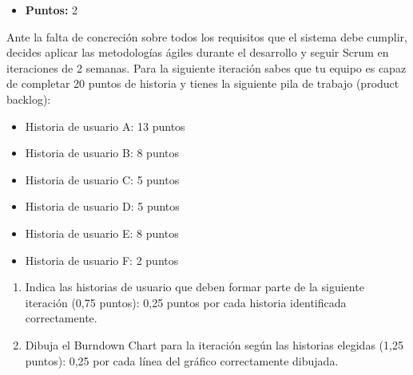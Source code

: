 \begin{itemize}
    \item \textbf{Puntos:} 2
\end{itemize}

\begin{enunciado}
    Ante la falta de concreción sobre todos los requisitos que el sistema debe cumplir, decides aplicar las metodologías ágiles durante el desarrollo y seguir Scrum en iteraciones de 2 semanas.
    Para la siguiente iteración sabes que tu equipo es capaz de completar 20 puntos de historia y tienes la siguiente pila de trabajo (product backlog):
    \begin{itemize}
        \item Historia de usuario A: 13 puntos
        \item Historia de usuario B: 8 puntos
        \item Historia de usuario C: 5 puntos
        \item Historia de usuario D: 5 puntos
        \item Historia de usuario E: 8 puntos
        \item Historia de usuario F: 2 puntos
    \end{itemize}
    \begin{enumerate}[label=\Alph*)]
        \item Indica las historias de usuario que deben formar parte de la siguiente iteración (0,75 puntos): 0,25 puntos por cada historia identificada correctamente.
        \item Dibuja el Burndown Chart para la iteración según las historias elegidas (1,25 puntos): 0,25 por cada línea del gráfico correctamente dibujada.
    \end{enumerate}
\end{enunciado}

